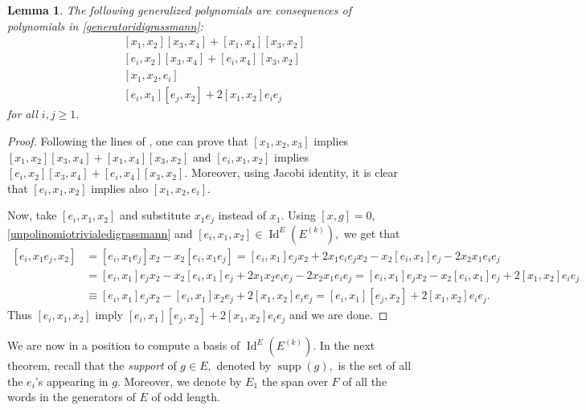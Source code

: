 \documentclass[reqno]{amsart}
\newtheorem{lemma}[theorem]{Lemma}
\theoremstyle{definition}
\numberwithin{equation}{section}
\numberwithin{theorem}{section}
\DeclareMathOperator{\I}{Id}
\DeclareMathOperator{\supp}{supp}
\begin{document}
\begin{lemma}\label{conseguenzeGrassmann}
    The following generalized polynomials are consequences of polynomials in \eqref{generatoridigrassmann}:
    \begin{equation*}
        \begin{split}
            &[x_1,x_2][x_3,x_4]+[x_1,x_4][x_3,x_2] \\
            &[e_i,x_2][x_3,x_4]+[e_i,x_4][x_3,x_2] \\
            & [x_1,x_2,e_i] \\
            & [e_i,x_1][e_j,x_2] + 2[x_1,x_2]e_ie_j
        \end{split}
    \end{equation*}
    for all $i,j\geq1.$
\end{lemma}
\begin{proof}
    Following the lines of \cite[Theorem 4.1.8]{GZbook}, one can prove that $[x_1,x_2,x_3]$ implies $[x_1,x_2][x_3,x_4]+[x_1,x_4][x_3,x_2]$ and $[e_i,x_1,x_2]$ implies $[e_i,x_2][x_3,x_4]+[e_i,x_4][x_3,x_2].$ Moreover, using Jacobi identity, it is clear that $[e_i,x_1,x_2]$ implies also $[x_1,x_2,e_i].$

    Now, take $[e_i,x_1,x_2]$ and substitute $x_1e_j$ instead of $x_1.$ Using $[x,g]=0,$ \eqref{unpolinomiotrivialedigrassmann} and $[e_i,x_1,x_2]\in \I^E(E^{(k)}),$ we get that 
    \begin{equation*}
        \begin{split}
             [e_i,x_1e_j, x_2]&= [e_i,x_1e_j]x_2-x_2[e_i,x_1e_j] = [e_i,x_1]e_jx_2+2x_1e_ie_jx_2-x_2[e_i,x_1]e_j-2x_2x_1e_ie_j \\
            &=[e_i,x_1]e_jx_2 -x_2[e_i,x_1]e_j+2x_1x_2e_ie_j-2x_2x_1e_ie_j 
            = [e_i,x_1]e_jx_2-x_2[e_i,x_1]e_j +2[x_1,x_2]e_ie_j \\
            &\equiv [e_i,x_1]e_jx_2 - [e_i,x_1]x_2 e_j +2[x_1,x_2]e_ie_j = [e_i,x_1][e_j,x_2] +2[x_1,x_2]e_ie_j.
        \end{split}
    \end{equation*}
    Thus $[e_i,x_1,x_2]$ imply $[e_i,x_1][e_j,x_2] + 2[x_1,x_2]e_ie_j$ and we are done.
\end{proof}

We are now in a position to compute a basis of $\I^E(E^{(k)}).$ In the next theorem, recall that the \emph{support} of $g\in E,$ denoted by $\supp(g),$ is the set of all the $e_i$'s appearing in $g.$ Moreover, we denote by $E_1$ the span over $F$ of all the words in the generators of $E$ of odd length.
 
\end{document}
